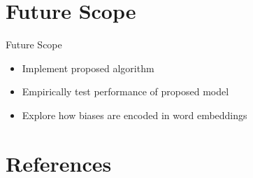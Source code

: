 \documentclass{beamer}
\begin{document}
	\section{Future Scope}
	\begin{frame}{Future Scope}
		\begin{itemize}
			\item Implement proposed algorithm
			\item Empirically test performance of proposed model
			\item Explore how biases are encoded in word embeddings
		\end{itemize}
	\end{frame}
	
	
	\section{References}
\end{document}
